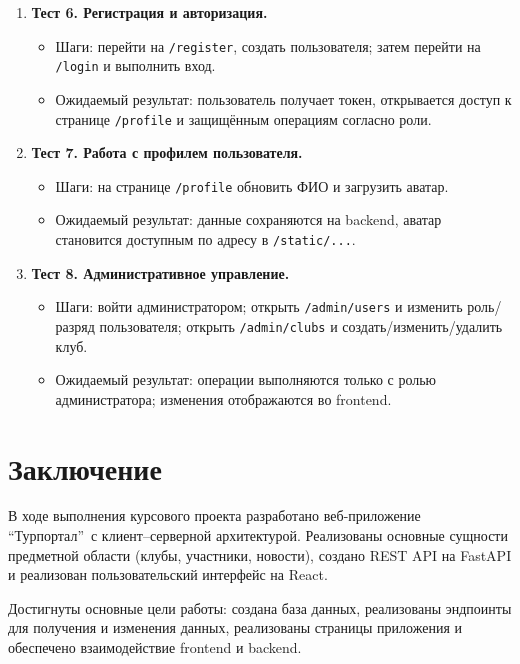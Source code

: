 \documentclass[utf8, russian]{eskdtext}
\let\stdsection\section
\renewcommand \section{\newpage\stdsection}
\begin{document}
\begin{enumerate}
  \item \textbf{Тест 6. Регистрация и авторизация.}
  \begin{itemize}
    \item Шаги: перейти на \texttt{/register}, создать пользователя; затем перейти на \texttt{/login} и выполнить вход.
    \item Ожидаемый результат: пользователь получает токен, открывается доступ к странице \texttt{/profile} и защищённым операциям согласно роли.
  \end{itemize}

  \item \textbf{Тест 7. Работа с профилем пользователя.}
  \begin{itemize}
    \item Шаги: на странице \texttt{/profile} обновить ФИО и загрузить аватар.
    \item Ожидаемый результат: данные сохраняются на backend, аватар становится доступным по адресу в \texttt{/static/...}.
  \end{itemize}

  \item \textbf{Тест 8. Административное управление.}
  \begin{itemize}
    \item Шаги: войти администратором; открыть \texttt{/admin/users} и изменить роль/разряд пользователя; открыть \texttt{/admin/clubs} и создать/изменить/удалить клуб.
    \item Ожидаемый результат: операции выполняются только с ролью администратора; изменения отображаются во frontend.
  \end{itemize}
\end{enumerate}

\section{Заключение}
В ходе выполнения курсового проекта разработано веб-приложение \textquotedblleft Турпортал\textquotedblright\ с клиент--серверной архитектурой. Реализованы основные сущности предметной области (клубы, участники, новости), создано REST API на FastAPI и реализован пользовательский интерфейс на React.

Достигнуты основные цели работы: создана база данных, реализованы эндпоинты для получения и изменения данных, реализованы страницы приложения и обеспечено взаимодействие frontend и backend.
\end{document}
